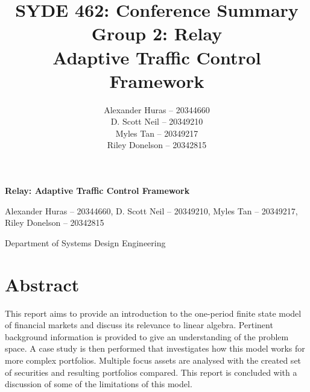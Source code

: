 \documentclass[a4paper,11pt]{report}
\author{  Alexander Huras -- 20344660\\
  D. Scott Neil -- 20349210\\
  Myles Tan -- 20349217\\
  Riley Donelson -- 20342815\\}
\title{SYDE 462: Conference Summary
\\Group 2: Relay \\
  Adaptive Traffic Control Framework}
\begin{document}


\centerline{  \bf \LARGE Relay: Adaptive Traffic Control Framework}
\centerline{Alexander Huras -- 20344660, D. Scott Neil -- 20349210, Myles Tan -- 20349217, Riley Donelson -- 20342815}
\centerline{Department of Systems Design Engineering}


\section{Abstract}
This report aims to provide an introduction to the one-period finite state model of financial markets and discuss its relevance to linear algebra. Pertinent background information is provided to give an understanding of the problem space.
A case study is then performed that investigates how this model works for more complex portfolios.
Multiple focus assets are analysed with the created set of securities and resulting portfolios compared.
This report is concluded with a discussion of some of the limitations of this model.
\\
\end{document}
